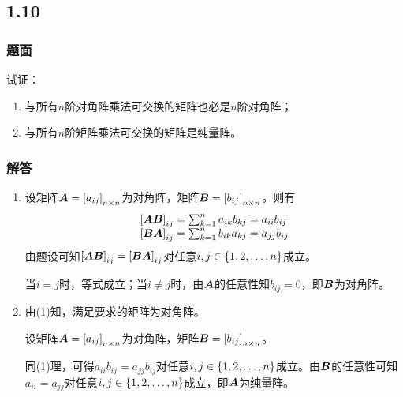 \documentclass[9pt,xcolor=svgnames]{beamer} %
\begin{document}
\subsection*{1.10}
\begin{frame}
    \frametitle{题面}
    试证：
    \begin{enumerate}
        \item 与所有\(n\)阶对角阵乘法可交换的矩阵也必是\(n\)阶对角阵；
        \item 与所有\(n\)阶矩阵乘法可交换的矩阵是纯量阵。
    \end{enumerate}
\end{frame}
\begin{frame}
    \frametitle{解答}
    \begin{enumerate}
        \item
              {
              设矩阵\(\boldsymbol{A}=\left[ a_{ij} \right]_{n\times n}\)为对角阵，矩阵\(\boldsymbol{B}=\left[ b_{ij} \right]_{n\times n}\)。则有
              \begin{equation*}
                  \begin{array}{lll}
                      \left[ \boldsymbol{A}\boldsymbol{B} \right]_{ij}=\sum_{k=1}^na_{ik}b_{kj}=a_{ii}b_{ij} \\
                      \left[ \boldsymbol{B}\boldsymbol{A} \right]_{ij}=\sum_{k=1}^nb_{ik}a_{kj}=a_{jj}b_{ij}
                  \end{array}
              \end{equation*}
              由题设可知\(\left[ \boldsymbol{A}\boldsymbol{B} \right]_{ij}=\left[ \boldsymbol{B}\boldsymbol{A} \right]_{ij}\)对任意\(i,j\in\left\{1,2,\dots,n \right\}\)成立。

              当\(i=j\)时，等式成立；当\(i\neq j\)时，由\(\boldsymbol{A}\)的任意性知\(b_{ij}=0\)，即\(\boldsymbol{B}\)为对角阵。
              }
        \item
              {
              由(1)知，满足要求的矩阵为对角阵。

              设矩阵\(\boldsymbol{A}=\left[ a_{ij} \right]_{n\times n}\)为对角阵，矩阵\(\boldsymbol{B}=\left[ b_{ij} \right]_{n\times n}\)。

              同(1)理，可得\(a_{ii}b_{ij}=a_{jj}b_{ij}\)对任意\(i,j\in\left\{1,2,\dots,n \right\}\)成立。由\(\boldsymbol{B}\)的任意性可知\(a_{ii}=a_{jj}\)对任意\(i,j\in\left\{1,2,\dots,n \right\}\)成立，即\(\boldsymbol{A}\)为纯量阵。
              }
    \end{enumerate}
\end{frame}
\end{document}
